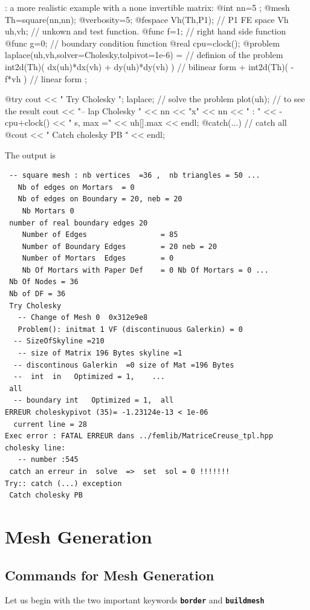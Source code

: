 \documentclass[a4paper,twoside,12pt]{book}
\def\n{\nabla}
\def\setS#1{#1\label{sec:#1}}
\begin{document}
\begin{example}: a more realistic example with a none invertible matrix:
\bFF
@int nn=5        ;
@mesh Th=square(nn,nn);
@verbosity=5;
@fespace Vh(Th,P1);     // P1 FE space
Vh uh,vh;              // unkown and test function.
@func f=1;                 //  right hand side function
@func g=0;                 //  boundary condition function
@real   cpu=clock();
@problem laplace(uh,vh,solver=Cholesky,tolpivot=1e-6) =                    //  definion of  the problem
            int2d(Th)( dx(uh)*dx(vh) + dy(uh)*dy(vh) ) //  bilinear form
          + int2d(Th)( -f*vh )                          //  linear form
  ;

@try {
  cout << " Try Cholesky \n";
  laplace; // solve the problem 
  plot(uh); // to see the result
  cout << "-- lap Cholesky " << nn << "x" << nn << "  : " <<  -cpu+clock()
       << " s,  max =" << uh[].max << endl;
}
@catch(...) { // catch all
  @cout << " Catch cholesky PB " << endl;
}
\eFF
\end{example}
The output is
{\small
\begin{verbatim}
 -- square mesh : nb vertices  =36 ,  nb triangles = 50 ...
   Nb of edges on Mortars  = 0
   Nb of edges on Boundary = 20, neb = 20
    Nb Mortars 0
 number of real boundary edges 20
    Number of Edges                 = 85
    Number of Boundary Edges        = 20 neb = 20
    Number of Mortars  Edges        = 0
    Nb Of Mortars with Paper Def    = 0 Nb Of Mortars = 0 ...
 Nb Of Nodes = 36
 Nb of DF = 36
 Try Cholesky
   -- Change of Mesh 0  0x312e9e8
   Problem(): initmat 1 VF (discontinuous Galerkin) = 0
  -- SizeOfSkyline =210
   -- size of Matrix 196 Bytes skyline =1
  -- discontinous Galerkin  =0 size of Mat =196 Bytes
  --  int  in   Optimized = 1,    ...
 all
  -- boundary int   Optimized = 1,  all
ERREUR choleskypivot (35)= -1.23124e-13 < 1e-06
  current line = 28
Exec error : FATAL ERREUR dans ../femlib/MatriceCreuse_tpl.hpp
cholesky line:
   -- number :545
 catch an erreur in  solve  =>  set  sol = 0 !!!!!!!
Try:: catch (...) exception
 Catch cholesky PB
\end{verbatim}
}


\section{\setS{Mesh Generation}}
\subsection{Commands for Mesh Generation}\label{sec:InitialMesh}
Let us begin with the two important keywords \texttt{\bf border} and \texttt{\bf buildmesh}
%
%
%
\end{document}
